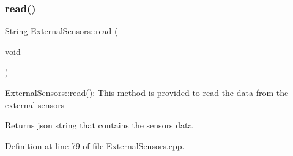\subsubsection{\texorpdfstring{read()}{read()}}
{\footnotesize\ttfamily String External\+Sensors\+::read (\begin{DoxyParamCaption}\item[{void}]{ }\end{DoxyParamCaption})}

\hyperlink{class_external_sensors_a53177b81eca3be89508b5511ddcd00fc}{External\+Sensors\+::read()}\+: This method is provided to read the data from the external sensors

\begin{DoxyReturn}{Returns}
json string that contains the sensors data 
\end{DoxyReturn}


Definition at line 79 of file External\+Sensors.\+cpp.


